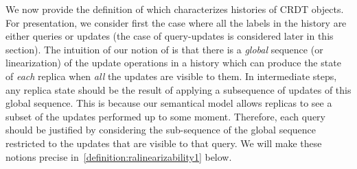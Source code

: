 We now provide the definition of \crdtlin{} which characterizes histories of CRDT objects.
For presentation, we consider first the case where all the labels in the history are
either queries or updates (the case of query-updates is considered later in this section).
%
%
%
The intuition of our notion of \crdtlin{} is that there is a \emph{global} sequence
(or linearization) of the update operations in a history which can
produce the state of \emph{each} replica when \emph{all} the updates are visible to them.
In intermediate steps, any replica state should be the result of applying a subsequence of updates
of this global sequence. This is because our semantical model allows replicas to see a subset of the updates
performed up to some moment.
Therefore, each query should be justified by considering the
sub-sequence of the global sequence restricted to the updates that are
visible to that query.
We will make these notions precise in~\autoref{definition:ralinearizability1} below.


